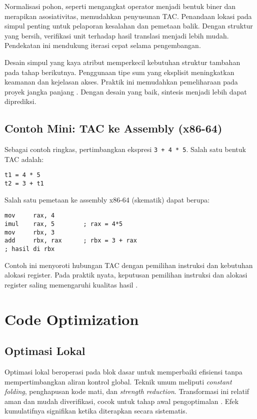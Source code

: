 \documentclass[../main.tex]{subfiles}
\begin{document}
Normalisasi pohon, seperti mengangkat operator menjadi bentuk biner dan merapikan asosiativitas, memudahkan penyusunan TAC. Penandaan lokasi pada simpul penting untuk pelaporan kesalahan dan pemetaan balik. Dengan struktur yang bersih, verifikasi unit terhadap hasil translasi menjadi lebih mudah. Pendekatan ini mendukung iterasi cepat selama pengembangan.

Desain simpul yang kaya atribut memperkecil kebutuhan struktur tambahan pada tahap berikutnya. Penggunaan tipe sum yang eksplisit meningkatkan keamanan dan kejelasan akses. Praktik ini memudahkan pemeliharaan pada proyek jangka panjang \citep{WikiAST}. Dengan desain yang baik, sintesis menjadi lebih dapat diprediksi.

\subsection{Contoh Mini: TAC ke Assembly (x86-64)}
Sebagai contoh ringkas, pertimbangkan ekspresi \texttt{3 + 4 * 5}. Salah satu bentuk TAC adalah:
\begin{verbatim}
t1 = 4 * 5
t2 = 3 + t1
\end{verbatim}
Salah satu pemetaan ke assembly x86-64 (skematik) dapat berupa:
\begin{verbatim}
mov     rax, 4
imul    rax, 5        ; rax = 4*5
mov     rbx, 3
add     rbx, rax      ; rbx = 3 + rax
; hasil di rbx
\end{verbatim}
Contoh ini menyoroti hubungan TAC dengan pemilihan instruksi dan kebutuhan alokasi register. Pada praktik nyata, keputusan pemilihan instruksi dan alokasi register saling memengaruhi kualitas hasil \citep{WikiInstructionSelection,WikiRegisterAllocation}.

\section{Code Optimization}
\subsection{Optimasi Lokal}
Optimasi lokal beroperasi pada blok dasar untuk memperbaiki efisiensi tanpa mempertimbangkan aliran kontrol global. Teknik umum meliputi \emph{constant folding}, penghapusan kode mati, dan \emph{strength reduction}. Transformasi ini relatif aman dan mudah diverifikasi, cocok untuk tahap awal pengoptimalan \citep{WikiConstantFolding,WikiDCE,WikiStrengthReduction}. Efek kumulatifnya signifikan ketika diterapkan secara sistematis.
\end{document}
